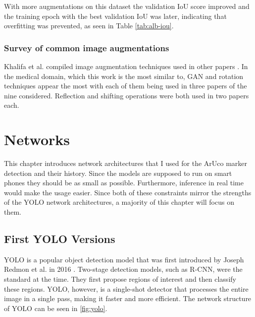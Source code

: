 \documentclass[10pt]{book}
\newcommand{\figureref}[1]{\autoref{#1}}
\begin{document}
With more augmentations on this dataset the validation \ac{IoU} score improved and the training epoch with the best validation \ac{IoU} was later, indicating that overfitting was prevented, as seen in Table \ref{tab:alb-iou}.

\subsection{Survey of common image augmentations}

Khalifa et al. compiled image augmentation techniques used in other papers \cite{khalifa2022comprehensive}. In the medical domain, which this work is the most similar to, \ac{GAN} and rotation techniques appear the most with each of them being used in three papers of the nine considered. Reflection and shifting operations were both used in two papers each.

\chapter{Networks}
\label{chap:netw}

This chapter introduces network architectures that I used for the \ac{ArUco} marker detection and their history. Since the models are supposed to run on smart phones they should be as small as possible. Furthermore, inference in real time would make the usage easier. Since both of these constraints mirror the strengths of the \ac{YOLO} network architectures, a majority of this chapter will focus on them.

\section{First YOLO Versions}

\ac{YOLO} is a popular object detection model that was first introduced by Joseph Redmon et al. in 2016 \cite{redmon2016you}. Two-stage detection models, such as R-CNN, were the standard at the time. They first propose regions of interest and then classify these regions. \ac{YOLO}, however, is a single-shot detector that processes the entire image in a single pass, making it faster and more efficient. The network structure of \ac{YOLO} can be seen in \figureref{fig:yolo}.
\end{document}
